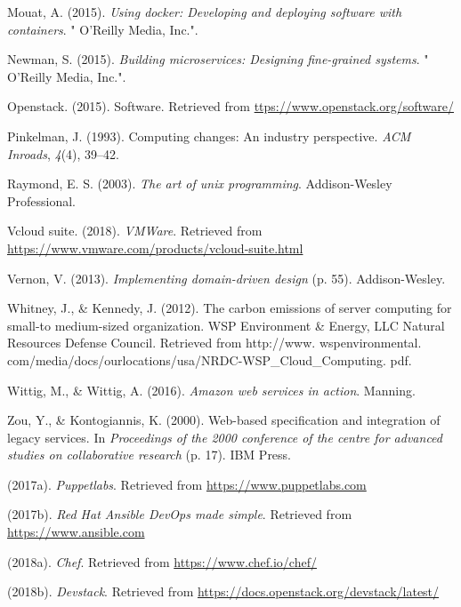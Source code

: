 \documentclass[12pt,twoside]{reedthesis}
\begin{document}
\leavevmode\hypertarget{ref-Cap4_Docker}{}%
Mouat, A. (2015). \emph{Using docker: Developing and deploying software with containers}. " O'Reilly Media, Inc.".

\leavevmode\hypertarget{ref-Cap3_Microservicios}{}%
Newman, S. (2015). \emph{Building microservices: Designing fine-grained systems}. " O'Reilly Media, Inc.".

\leavevmode\hypertarget{ref-Cap3_4_mT}{}%
Openstack. (2015). Software. Retrieved from \url{ttps://www.openstack.org/software/}

\leavevmode\hypertarget{ref-Cap1_ACMInroads}{}%
Pinkelman, J. (1993). Computing changes: An industry perspective. \emph{ACM Inroads}, \emph{4}(4), 39--42.

\leavevmode\hypertarget{ref-Cap3_ArtOfLinux}{}%
Raymond, E. S. (2003). \emph{The art of unix programming}. Addison-Wesley Professional.

\leavevmode\hypertarget{ref-Cap3_6_mT}{}%
Vcloud suite. (2018). \emph{VMWare}. Retrieved from \url{https://www.vmware.com/products/vcloud-suite.html}

\leavevmode\hypertarget{ref-Cap4_ImplementingPlantillaDibujo}{}%
Vernon, V. (2013). \emph{Implementing domain-driven design} (p. 55). Addison-Wesley.

\leavevmode\hypertarget{ref-Cap1_1_PdP}{}%
Whitney, J., \& Kennedy, J. (2012). The carbon emissions of server computing for small-to medium-sized organization. WSP Environment \& Energy, LLC Natural Resources Defense Council. Retrieved from http://www. wspenvironmental. com/media/docs/ourlocations/usa/NRDC-WSP\_Cloud\_Computing. pdf.

\leavevmode\hypertarget{ref-Cap3_7mT}{}%
Wittig, M., \& Wittig, A. (2016). \emph{Amazon web services in action}. Manning.

\leavevmode\hypertarget{ref-Cap1_WebBased}{}%
Zou, Y., \& Kontogiannis, K. (2000). Web-based specification and integration of legacy services. In \emph{Proceedings of the 2000 conference of the centre for advanced studies on collaborative research} (p. 17). IBM Press.

\leavevmode\hypertarget{ref-Cap3_Puppet}{}%
(2017a). \emph{Puppetlabs}. Retrieved from \url{https://www.puppetlabs.com}

\leavevmode\hypertarget{ref-Cap3_ansible}{}%
(2017b). \emph{Red Hat Ansible DevOps made simple}. Retrieved from \url{https://www.ansible.com}

\leavevmode\hypertarget{ref-Cap3_9mT}{}%
(2018a). \emph{Chef}. Retrieved from \url{https://www.chef.io/chef/}

\leavevmode\hypertarget{ref-Cap4_devstack}{}%
(2018b). \emph{Devstack}. Retrieved from \url{https://docs.openstack.org/devstack/latest/}


\end{document}
